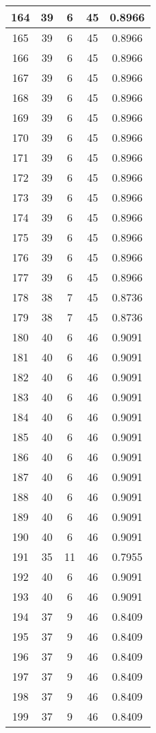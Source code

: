 \documentclass[letterpaper, 12pt]{article}
\begin{document}
\begin{longtable}{|c|c|c|c|c|}
\hline
164 & 39 & 6 & 45 & 0.8966 \\
\hline
165 & 39 & 6 & 45 & 0.8966 \\
\hline
166 & 39 & 6 & 45 & 0.8966 \\
\hline
167 & 39 & 6 & 45 & 0.8966 \\
\hline
168 & 39 & 6 & 45 & 0.8966 \\
\hline
169 & 39 & 6 & 45 & 0.8966 \\
\hline
170 & 39 & 6 & 45 & 0.8966 \\
\hline
171 & 39 & 6 & 45 & 0.8966 \\
\hline
172 & 39 & 6 & 45 & 0.8966 \\
\hline
173 & 39 & 6 & 45 & 0.8966 \\
\hline
174 & 39 & 6 & 45 & 0.8966 \\
\hline
175 & 39 & 6 & 45 & 0.8966 \\
\hline
176 & 39 & 6 & 45 & 0.8966 \\
\hline
177 & 39 & 6 & 45 & 0.8966 \\
\hline
178 & 38 & 7 & 45 & 0.8736 \\
\hline
179 & 38 & 7 & 45 & 0.8736 \\
\hline
180 & 40 & 6 & 46 & 0.9091 \\
\hline
181 & 40 & 6 & 46 & 0.9091 \\
\hline
182 & 40 & 6 & 46 & 0.9091 \\
\hline
183 & 40 & 6 & 46 & 0.9091 \\
\hline
184 & 40 & 6 & 46 & 0.9091 \\
\hline
185 & 40 & 6 & 46 & 0.9091 \\
\hline
186 & 40 & 6 & 46 & 0.9091 \\
\hline
187 & 40 & 6 & 46 & 0.9091 \\
\hline
188 & 40 & 6 & 46 & 0.9091 \\
\hline
189 & 40 & 6 & 46 & 0.9091 \\
\hline
190 & 40 & 6 & 46 & 0.9091 \\
\hline
191 & 35 & 11 & 46 & 0.7955 \\
\hline
192 & 40 & 6 & 46 & 0.9091 \\
\hline
193 & 40 & 6 & 46 & 0.9091 \\
\hline
194 & 37 & 9 & 46 & 0.8409 \\
\hline
195 & 37 & 9 & 46 & 0.8409 \\
\hline
196 & 37 & 9 & 46 & 0.8409 \\
\hline
197 & 37 & 9 & 46 & 0.8409 \\
\hline
198 & 37 & 9 & 46 & 0.8409 \\
\hline
199 & 37 & 9 & 46 & 0.8409 \\
\hline
\end{longtable}
\end{document}
